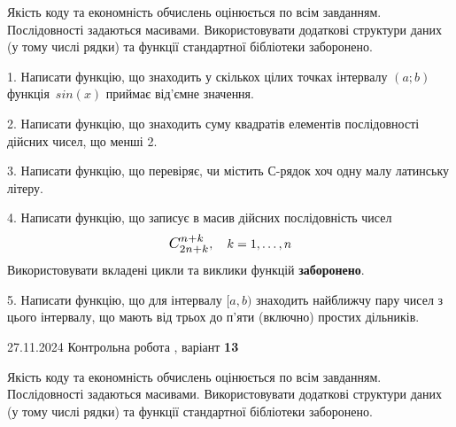 \documentclass[12pt, ukrainian]{article}
\begin{document}
{{{{{{{{{{{{
Якість коду та економність обчислень оцінюється по всім завданням. Послідовності задаються масивами. Використовувати додаткові структури даних (у тому числі рядки) та функції стандартної бібліотеки заборонено.

\vspace{2mm}

\begin {large}
1. Написати функцію, що знаходить у скількох цілих точках інтервалу $(a; b)$ функція~$sin(x)$ приймає від'ємне значення.

\vspace{2mm}


2. Написати функцію, що знаходить суму квадратів елементів послідовності дійсних чисел, що менші 2.

\vspace{2mm}


3. Написати функцію, що перевіряє, чи містить С-рядок хоч одну малу латинську літеру.

\vspace{2mm}


4. 
Написати функцію, що записує в масив дійсних послідовність чисел
$$\scalebox{1.2}{$C_{2n+k}^{n+k}$}, \quad k=1,\ldots,n$$
Використовувати вкладені цикли та виклики функцій \textbf{заборонено}.

\vspace{2mm}


5. Написати функцію, що для інтервалу $[a, b)$ знаходить найближчу пару чисел з цього інтервалу, що мають від трьох до п'яти (включно) простих дільників.

\vspace{2mm}

\end{large}
\newpage
{{27.11.2024 Контрольна робота , варіант  \No \textbf { 13 }\par}}


{
Якість коду та економність обчислень оцінюється по всім завданням. Послідовності задаються масивами. Використовувати додаткові структури даних (у тому числі рядки) та функції стандартної бібліотеки заборонено.

}}}}}}}}}}}}}
\end{document}
